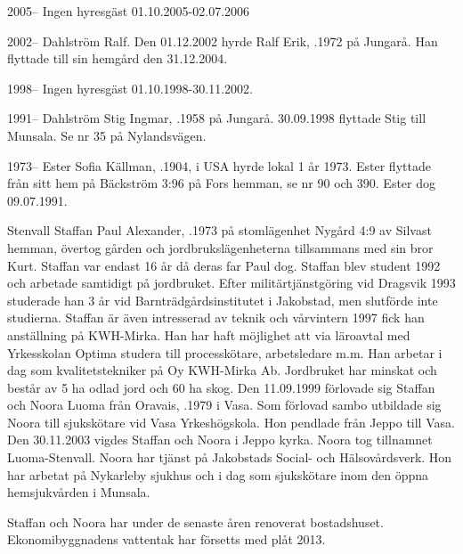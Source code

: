2005--
Ingen hyresgäst 01.10.2005-02.07.2006

2002--
Dahlström Ralf. Den 01.12.2002 hyrde Ralf	Erik, .1972 på Jungarå. Han flyttade till sin hemgård den 31.12.2004.

1998--
Ingen hyresgäst 01.10.1998-30.11.2002.

1991--
Dahlström Stig Ingmar, .1958 på Jungarå. 30.09.1998 flyttade Stig till Munsala. Se nr 35 på Nylandsvägen.

1973--
Ester Sofia Källman, .1904, i USA hyrde lokal 1 år 1973. Ester flyttade från sitt hem på Bäckström 3:96 på Fors hemman, se nr 90 och 390. Ester dog 09.07.1991.




Stenvall Staffan Paul Alexander, .1973 på stomlägenhet Nygård 4:9 av Silvast hemman, övertog gården och jordbrukslägenheterna tillsammans med sin bror Kurt. Staffan var endast 16 år då deras far Paul dog. Staffan blev student 1992 och arbetade samtidigt på jordbruket. Efter militärtjänstgöring vid Dragsvik 1993 studerade han 3 år vid Barnträdgårdsinstitutet i Jakobstad, men slutförde inte studierna. Staffan är även intresserad av teknik och vårvintern 1997 fick han anställning på KWH-Mirka. Han har haft möjlighet att via läroavtal med Yrkesskolan Optima studera till processkötare, arbetsledare m.m.  Han arbetar i dag som kvalitetstekniker på Oy KWH-Mirka Ab. Jordbruket har minskat och består av 5 ha odlad jord och 60 ha skog.
Den 11.09.1999 förlovade sig Staffan och Noora Luoma från Oravais,	.1979 i Vasa. Som förlovad sambo utbildade sig Noora till sjukskötare vid Vasa Yrkeshögskola. Hon pendlade från Jeppo till Vasa. Den 30.11.2003 vigdes Staffan och Noora i Jeppo kyrka. Noora tog tillnamnet Luoma-Stenvall. Noora har tjänst på Jakobstads Social- och Hälsovårdsverk. Hon har arbetat på Nykarleby sjukhus och i dag som sjukskötare inom den öppna hemsjukvården i Munsala.
\begin{jhchildren}
  \item {}
  \item {}
  \item {}
\end{jhchildren}
Staffan och Noora har under de senaste åren renoverat bostadshuset. Ekonomibyggnadens vattentak har försetts med plåt 2013.


